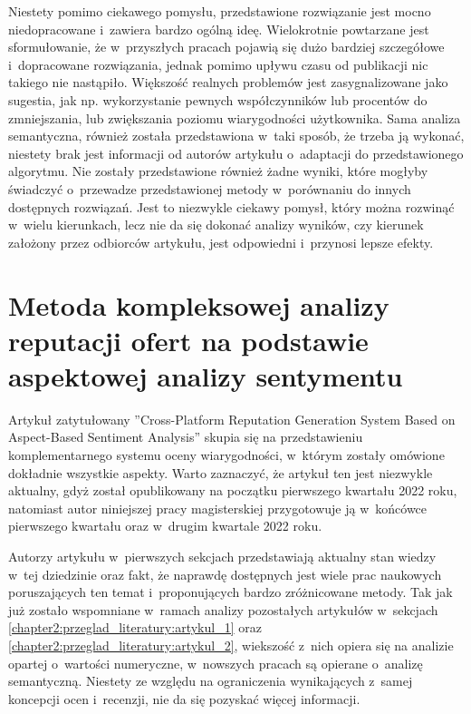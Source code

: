 \documentclass[../Kamil_Kowalewski_Main.tex]{subfiles}
\begin{document}
{{        Niestety pomimo ciekawego pomysłu, przedstawione rozwiązanie jest mocno
        niedopracowane i~zawiera bardzo ogólną ideę. Wielokrotnie powtarzane jest
        sformułowanie, że w~przyszłych pracach pojawią się dużo bardziej szczegółowe
        i~dopracowane rozwiązania, jednak pomimo upływu czasu od publikacji nic takiego
        nie nastąpiło. Większość realnych problemów jest zasygnalizowane jako sugestia,
        jak np. wykorzystanie pewnych współczynników lub procentów do zmniejszania, lub
        zwiększania poziomu wiarygodności użytkownika. Sama analiza semantyczna, również
        została przedstawiona w~taki sposób, że trzeba ją wykonać, niestety brak jest
        informacji od autorów artykułu o~adaptacji do przedstawionego algorytmu. Nie
        zostały przedstawione również żadne wyniki, które mogłyby świadczyć o~przewadze
        przedstawionej metody w~porównaniu do innych dostępnych rozwiązań. Jest to
        niezwykle ciekawy pomysł, który można rozwinąć w~wielu kierunkach, lecz nie da
        się dokonać analizy wyników, czy kierunek założony przez odbiorców artykułu, jest
        odpowiedni i~przynosi lepsze efekty.

    }

    \section{Metoda kompleksowej analizy reputacji ofert na podstawie aspektowej analizy sentymentu}
    \label{chapter2:przeglad_literatury:artykul_3} {
        Artykuł zatytułowany ''Cross-Platform Reputation Generation System Based on
        Aspect-Based Sentiment Analysis''\cite{article:reputation_generation_system_2022}
        skupia się na przedstawieniu komplementarnego systemu oceny wiarygodności,
        w~którym zostały omówione dokładnie wszystkie aspekty. Warto zaznaczyć, że
        artykuł ten jest niezwykle aktualny, gdyż został opublikowany na początku
        pierwszego kwartału 2022 roku, natomiast autor niniejszej pracy magisterskiej
        przygotowuje ją w~końcówce pierwszego kwartału oraz w~drugim kwartale 2022 roku.

        Autorzy artykułu w~pierwszych sekcjach przedstawiają aktualny stan wiedzy w~tej
        dziedzinie oraz fakt, że naprawdę dostępnych jest wiele prac naukowych
        poruszających ten temat i~proponujących bardzo zróżnicowane metody. Tak jak już
        zostało wspomniane w~ramach analizy pozostałych artykułów w~sekcjach
        \ref{chapter2:przeglad_literatury:artykul_1} oraz
        \ref{chapter2:przeglad_literatury:artykul_2}, wiekszość z~nich opiera się na
        analizie opartej o~wartości numeryczne, w~nowszych pracach są opierane
        o~analizę semantyczną. Niestety ze względu na ograniczenia wynikających z~samej
        koncepcji ocen i~recenzji, nie da się pozyskać więcej informacji.

}}
\end{document}
